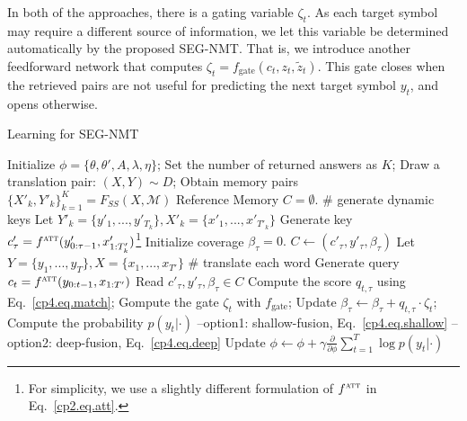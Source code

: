 In both of the approaches, there is a gating variable $\zeta_t$. As each target symbol may require a different source of information, we let this variable be determined automatically by the proposed SEG-NMT. That is, we introduce another feedforward network that computes $\zeta_t = f_{\text{gate}}(c_t, z_t, \tilde{z}_t)$. This gate closes when the retrieved pairs are not useful for predicting the next target symbol $y_t$, and opens otherwise. 

\begin{algorithm}[hpbt]
\caption{Learning for SEG-NMT}%
\label{cp4.algo.alg2}
\begin{algorithmic}[1]
\small
{}
\State Initialize $\phi = \{\theta, \theta', A, \lambda, \eta\}$;
\State Set the number of returned answers as $K$;
\State Draw a translation pair: $(X, Y)\sim D$;
\State Obtain memory pairs $\{X'_k, Y'_k\}_{k=1}^K = F_{SS}(X, \mathcal{M})$
\State Reference Memory $C=\emptyset$.
   \quad \quad \# generate dynamic keys
\State Let $Y'_k = \{y'_1, ..., y'_{T_k}\}, X'_k = \{x'_1, ..., x'_{T'_k}\}$
\State Generate key $c'_\tau = f^{\textsc{att}}(y'_{0:\tau-1}, x'_{1:T'_k})$\footnote{For simplicity, we use a slightly different formulation of $f^{\textsc{att}}$ in Eq.~\eqref{cp2.eq.att}.}
\State Initialize coverage $\beta_{\tau} = 0.$
\State $ C \leftarrow (c'_\tau, y'_\tau, \beta_{\tau})$
\EndFor 
\EndFor
\State Let $Y = \{y_1, ..., y_{T}\}, X = \{x_1, ..., x_{T'}\}$
 \quad \quad \# translate each word
\State Generate query $c_t = f^{\textsc{att}}(y_{0:t-1}, x_{1:T'})$
  Read $c'_\tau, y'_\tau,  \beta_{\tau} \in C$
\State Compute the score $q_{t, \tau}$ using Eq.~\ref{cp4.eq.match};
\State Gompute the gate $\zeta_t$ with $f_{\text{gate}}$;
\State Update $\beta_{\tau} \leftarrow \beta_{\tau} + q_{t, \tau}\cdot\zeta_t$;
\EndFor
\State Compute the probability $p(y_t|\cdot)$
\State \hspace{10pt} --option1: shallow-fusion, Eq.~\ref{cp4.eq.shallow}
\State  \hspace{10pt} --option2: deep-fusion, Eq.~\ref{cp4.eq.deep}
\EndFor 
\State Update $\phi \leftarrow \phi  +\gamma\frac{\partial}{\partial \phi} \sum_{t=1}^T\log p(y_t|\cdot)$
\EndWhile
\end{algorithmic}
\end{algorithm}

